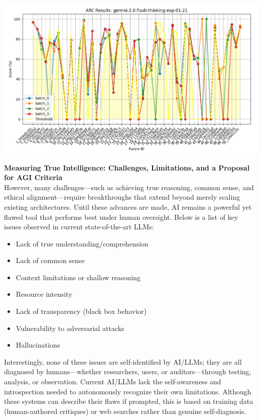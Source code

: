\documentclass[11pt]{scrartcl}
\begin{document}
\includegraphics[width=0.99\linewidth, center]{gemini-2.0-flash-thinking-exp-01-21.png}

\vspace{2cm}

\textbf{Measuring True Intelligence: Challenges, Limitations, and a Proposal for AGI Criteria} \\
However, many challenges—such as achieving true reasoning, common sense, and ethical alignment—require breakthroughs that extend beyond merely scaling existing architectures. Until these advances are made, AI remains a powerful yet flawed tool that performs best under human oversight. Below is a list of key issues observed in current state-of-the-art LLMs:
\begin{itemize}
    \item Lack of true understanding/comprehension
    \item Lack of common sense
    \item Context limitations or shallow reasoning
    \item Resource intensity
    \item Lack of transparency (black box behavior)
    \item Vulnerability to adversarial attacks
    \item Hallucinations
\end{itemize}
Interestingly, none of these issues are self-identified by AI/LLMs; they are all diagnosed by humans—whether researchers, users, or auditors—through testing, analysis, or observation. Current AI/LLMs lack the self-awareness and introspection needed to autonomously recognize their own limitations. Although these systems can describe their flaws if prompted, this is based on training data (human-authored critiques) or web searches rather than genuine self-diagnosis. \\
\end{document}
